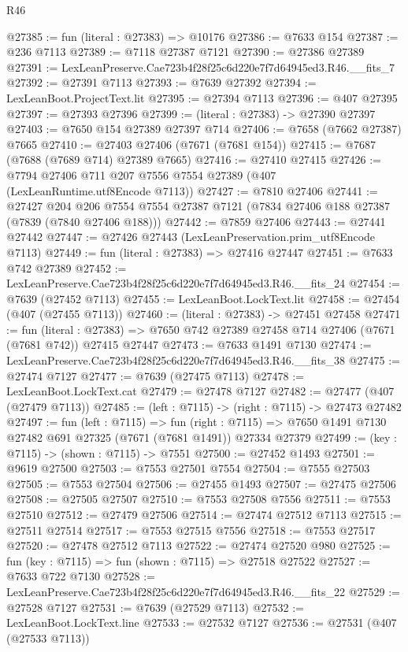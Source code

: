 \begin{lexlean}{R46}
\begin{coremodule}
@27385 := fun (literal : @27383) => @10176
@27386 := @7633 @154
@27387 := @236 @7113
@27389 := @7118 @27387 @7121
@27390 := @27386 @27389
@27391 := LexLeanPreserve.Cae723b4f28f25c6d220e7f7d64945ed3.R46.__fits_7
@27392 := @27391 @7113
@27393 := @7639 @27392
@27394 := LexLeanBoot.ProjectText.lit
@27395 := @27394 @7113
@27396 := @407 @27395
@27397 := @27393 @27396
@27399 := (literal : @27383) -> @27390 @27397
@27403 := @7650 @154 @27389 @27397 @714
@27406 := @7658 (@7662 @27387) @7665
@27410 := @27403 @27406 (@7671 (@7681 @154))
@27415 := @7687 (@7688 (@7689 @714) @27389 @7665)
@27416 := @27410 @27415
@27426 := @7794 @27406 @711 @207 @7556 @7554 @27389 (@407 (LexLeanRuntime.utf8Encode @7113))
@27427 := @7810 @27406
@27441 := @27427
    @204
    @206
    @7554
    @7554
    @27387
    @7121
    (@7834 @27406 @188 @27387 (@7839 (@7840 @27406 @188)))
@27442 := @7859 @27406
@27443 := @27441 @27442
@27447 := @27426 @27443 (LexLeanPreservation.prim_utf8Encode @7113)
@27449 := fun (literal : @27383) => @27416 @27447
@27451 := @7633 @742 @27389
@27452 := LexLeanPreserve.Cae723b4f28f25c6d220e7f7d64945ed3.R46.__fits_24
@27454 := @7639 (@27452 @7113)
@27455 := LexLeanBoot.LockText.lit
@27458 := @27454 (@407 (@27455 @7113))
@27460 := (literal : @27383) -> @27451 @27458
@27471 := fun (literal : @27383) =>
  @7650 @742 @27389 @27458 @714 @27406 (@7671 (@7681 @742)) @27415 @27447
@27473 := @7633 @1491 @7130
@27474 := LexLeanPreserve.Cae723b4f28f25c6d220e7f7d64945ed3.R46.__fits_38
@27475 := @27474 @7127
@27477 := @7639 (@27475 @7113)
@27478 := LexLeanBoot.LockText.cat
@27479 := @27478 @7127
@27482 := @27477 (@407 (@27479 @7113))
@27485 := (left : @7115) -> (right : @7115) -> @27473 @27482
@27497 := fun (left : @7115) =>
  fun (right : @7115) => @7650 @1491 @7130 @27482 @691 @27325 (@7671 (@7681 @1491)) @27334 @27379
@27499 := (key : @7115) -> (shown : @7115) -> @7551
@27500 := @27452 @1493
@27501 := @9619 @27500
@27503 := @7553 @27501 @7554
@27504 := @7555 @27503
@27505 := @7553 @27504
@27506 := @27455 @1493
@27507 := @27475 @27506
@27508 := @27505 @27507
@27510 := @7553 @27508 @7556
@27511 := @7553 @27510
@27512 := @27479 @27506
@27514 := @27474 @27512 @7113
@27515 := @27511 @27514
@27517 := @7553 @27515 @7556
@27518 := @7553 @27517
@27520 := @27478 @27512 @7113
@27522 := @27474 @27520 @980
@27525 := fun (key : @7115) => fun (shown : @7115) => @27518 @27522
@27527 := @7633 @722 @7130
@27528 := LexLeanPreserve.Cae723b4f28f25c6d220e7f7d64945ed3.R46.__fits_22
@27529 := @27528 @7127
@27531 := @7639 (@27529 @7113)
@27532 := LexLeanBoot.LockText.line
@27533 := @27532 @7127
@27536 := @27531 (@407 (@27533 @7113))

\end{coremodule}
\end{lexlean}
